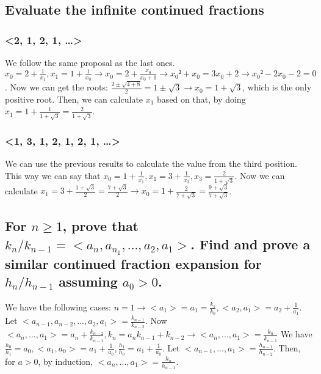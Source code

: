 \documentclass[11pt]{article}
\begin{document}
\subsection*{Evaluate the infinite continued fractions}
\label{sec:org4f692ba}
\subsubsection*{<2, 1, 2, 1, \ldots{}>}
\label{sec:orgc61dd05}
We follow the same proposal as the last ones. \(x_0 = 2 + \frac{1}{x_1}, x_1 = 1 + \frac{1}{x_0} \to x_0 = 2 + \frac{x_0}{x_0 + 1} \to x_0² + x_0 = 3x_0 + 2 \to x_0² - 2x_0 - 2 = 0\). Now we can get the roots: \(\frac{2 \pm \sqrt{4 + 8}}{2} = 1 \pm \sqrt3 \to x_0 = 1 + \sqrt3\), which is the only positive root. Then, we can calculate \(x_1\) based on that, by doing \(x_1 = 1 + \frac{1}{1+\sqrt3} = \frac{2}{1 + \sqrt3}\).
\subsubsection*{<1, 3, 1, 2, 1, 2, 1, \ldots{}>}
\label{sec:org5f1dec5}
We can use the previous results to calculate the value from the third position. This way we can say that \(x_0 = 1 + \frac{1}{x_1}, x_1 = 3 + \frac{1}{x_3}, x_3 = \frac{2}{1 + \sqrt3}\). Now we can calculate \(x_1 = 3 + \frac{1 + \sqrt3}{2} = \frac{7 + \sqrt3}{2} \to x_0 = 1 + \frac{2}{7 + \sqrt3} = \frac{9 + \sqrt3}{7 + \sqrt3}\).
\subsection*{For \(n \ge 1\), prove that \(k_n/k_{n-1} = <a_n,a_{n_1},...,a_2,a_1>\). Find and prove a similar continued fraction expansion for \(h_n/h_{n-1}\) assuming \(a_0 > 0\).}
\label{sec:org0755a5f}
We have the following cases: \(n = 1 \to <a_1> = a_1 = \frac{k_1}{k_0}, <a_2, a_1> = a_2 + \frac{1}{a_1}\). Let \(<a_{n-1}, a_{n-2}, ..., a_2, a_1> = \frac{k_{n-1}}{k_{n-2}}\). Now \(<a_n, ..., a_1> = a_n + \frac{k_{n-2}}{k_{n-1}}, k_n = a_nk_{n-1} + k_{n-2} \to <a_n, ..., a_1> = \frac{k_n}{k_{n-1}}\)
We have \(\frac{h_0}{h_1} = a_0, <a_1, a_0> = a_1 + \frac{1}{a_0}, \frac{h_1}{h_0} = a_1 + \frac{1}{a_0}\). Let \(<a_{n-1}, ..., a_1> = \frac{h_{n-1}}{h_{n-2}}\). Then, for \(a>0\), by induction, \(<a_n, ..., a_1> = \frac{h_n}{h_{n-1}}\).
\end{document}
